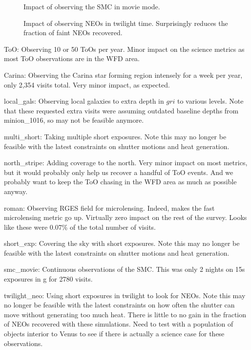\begin{figure}
\caption{Impact of observing the SMC in movie mode.  \label{fig:smc}}
\end{figure}


\begin{figure}
\caption{Impact of observing NEOs in twilight time. Surprisingly reduces the fraction of faint NEOs recovered. \label{fig:twilight}}
\end{figure}

ToO: Observing 10 or 50 ToOs per year. Minor impact on the science metrics as most ToO observations are in the WFD area.


Carina:  Observing the Carina star forming region intensely for a week per year, only 2,354 visits total.  Very minor impact, as expected.


local\_gals:  Observing local galaxies to extra depth in $gri$ to various levels. Note that these requested extra visits were assuming outdated baseline depths from minion\_1016, so may not be feasible anymore.

multi\_short:  Taking multiple short exposures. Note this may no longer be feasible with the latest constraints on shutter motions and heat generation.

north\_stripe:  Adding coverage to the north. Very minor impact on most metrics, but it would probably only help us recover a handful of ToO events. And we probably want to keep the ToO chasing in the WFD area as much as possible anyway.

roman: Observing RGES field for microlensing. Indeed, makes the fast microlensing metric go up. Virtually zero impact on the rest of the survey. Looks like these were 0.07\% of the total number of visits. 

short\_exp: Covering the sky with short exposures. Note this may no longer be feasible with the latest constraints on shutter motions and heat generation.

smc\_movie: Continuous observations of the SMC. This was only 2 nights on 15s exposures in g for 2780 visits. 

twilight\_neo:  Using short exposures in twilight to look for NEOs. Note this may no longer be feasible with the latest constraints on how often the shutter can move without generating too much heat. There is little to no gain in the fraction of NEOs recovered with these simulations. Need to test with a population of objects interior to Venus to see if there is actually a science case for these observations.  

